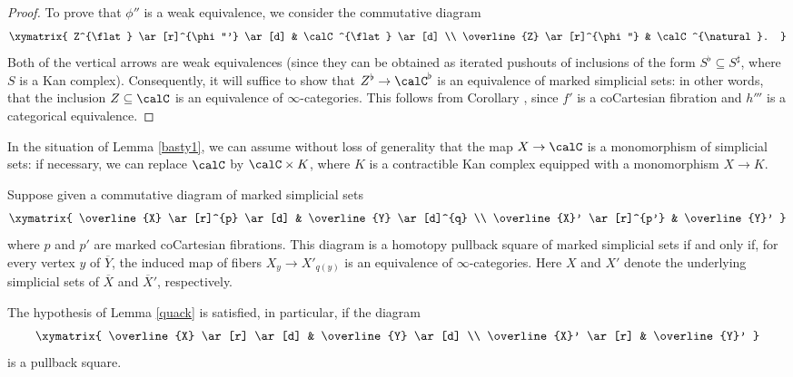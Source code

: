 \begin{proof}
To prove that $\phi''$ is a weak equivalence, we consider the commutative diagram
$$ \xymatrix{ Z^{\flat} \ar[r]^{\phi'''} \ar[d] & \calC^{\flat} \ar[d] \\
\overline{Z} \ar[r]^{\phi''} & \calC^{\natural}. }$$
Both of the vertical arrows are weak equivalences (since they can be obtained as iterated
pushouts of inclusions of the form $S^{\flat} \subseteq S^{\sharp}$, where $S$ is a Kan complex).
Consequently, it will suffice to show that $Z^{\flat} \rightarrow \calC^{\flat}$ is an equivalence of marked simplicial sets: in other words, that the inclusion $Z \subseteq \calC$ is an equivalence of $\infty$-categories. This follows from Corollary , since $f'$ is a coCartesian fibration and
$h'''$ is a categorical equivalence.
\end{proof}

\begin{remark}
In the situation of Lemma \ref{basty1}, we can assume without loss of generality that the map
$X \rightarrow \calC$ is a monomorphism of simplicial sets: if necessary, we can replace
$\calC$ by $\calC \times K$, where $K$ is a contractible Kan complex equipped with a monomorphism $X \rightarrow K$.
\end{remark}

\begin{lemma}\label{quack}
Suppose given a commutative diagram of marked simplicial sets
$$ \xymatrix{ \overline{X} \ar[r]^{p} \ar[d] & \overline{Y} \ar[d]^{q} \\
\overline{X}' \ar[r]^{p'} & \overline{Y}' }$$
where $p$ and $p'$ are marked coCartesian fibrations. This diagram is a
homotopy pullback square of marked simplicial sets if and only if, for every vertex
$y$ of $\overline{Y}$, the induced map of fibers $X_{y} \rightarrow X'_{q(y)}$ is an
equivalence of $\infty$-categories. Here $X$ and $X'$ denote the underlying simplicial
sets of $\overline{X}$ and $\overline{X}'$, respectively.
\end{lemma}

\begin{remark}
The hypothesis of Lemma \ref{quack} is satisfied, in particular, if the diagram
$$ \xymatrix{ \overline{X} \ar[r] \ar[d] & \overline{Y} \ar[d] \\
\overline{X}' \ar[r] & \overline{Y}' }$$
is a pullback square.
\end{remark}

